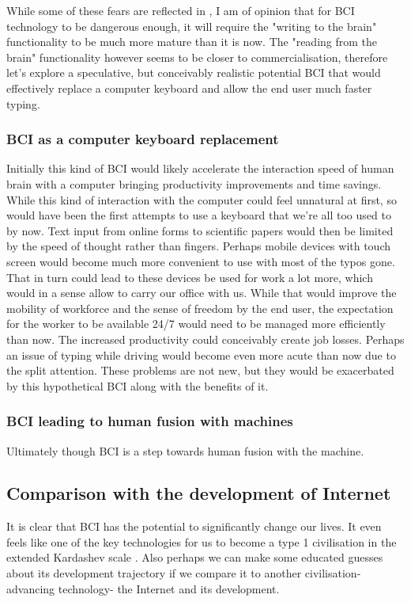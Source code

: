 \documentclass[fleqn,11pt]{olplainarticle}
\begin{document}
While some of these fears are reflected in \cite{liberatore_2021}, I am of opinion that for BCI technology to be dangerous enough, it will require the "writing to the brain" functionality to be much more mature than it is now. The "reading from the brain" functionality however seems to be closer to commercialisation, therefore let's explore a speculative, but conceivably realistic potential BCI that would effectively replace a computer keyboard and allow the end user much faster typing.

\subsubsection{BCI as a computer keyboard replacement}
Initially this kind of BCI would likely accelerate the interaction speed of human brain with a computer bringing productivity improvements and time savings. While this kind of interaction with the computer could feel unnatural at first, so would have been the first attempts to use a keyboard that we're all too used to by now. Text input from online forms to scientific papers would then be limited by the speed of thought rather than fingers. Perhaps mobile devices with touch screen would become much more convenient to use with most of the typos gone. That in turn could lead to these devices be used for work a lot more, which would in a sense allow to carry our office with us. While that would improve the mobility of workforce and the sense of freedom by the end user, the expectation for the worker to be available 24/7 would need to be managed more efficiently than now. The increased productivity could conceivably create job losses. Perhaps an issue of typing while driving would become even more acute than now due to the split attention. These problems are not new, but they would be exacerbated by this hypothetical BCI along with the benefits of it. 

\subsubsection{BCI leading to human fusion with machines}
Ultimately though BCI is a step towards human fusion with the machine.

\subsection{Comparison with the development of Internet}
It is clear that BCI has the potential to significantly change our lives. It even feels like one of the key technologies for us to become a type 1 civilisation in the extended Kardashev scale \cite{gray2020extended}. Also perhaps we can make some educated guesses about its development trajectory if we compare it to another civilisation-advancing technology- the Internet and its development.
\end{document}

